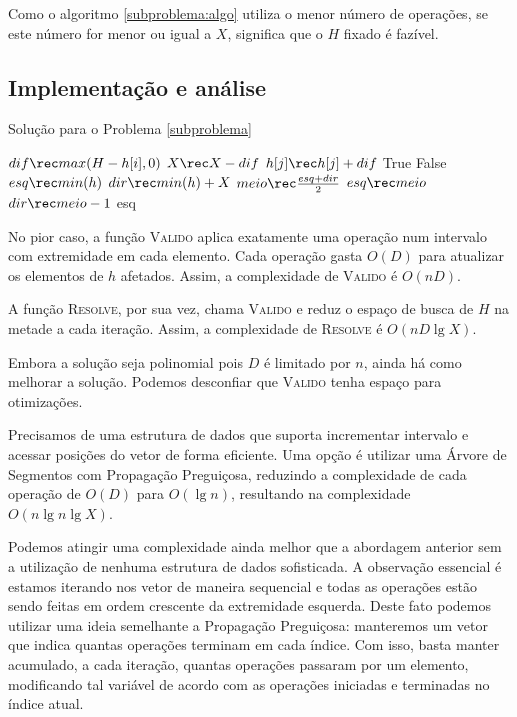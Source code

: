 Como o algoritmo \ref{subproblema:algo} utiliza o menor número de operações, se este número for menor ou igual a $X$, significa que o $H$ fixado é fazível.

\subsection*{Implementação e análise}

\begin{algorithm}[H]
\caption{Solução para o Problema \ref{subproblema}}
\label{subproblema:code}
\begin{algorithmic}[1]
        \State $dif \rec max(H - h[i], 0)$
        \State $X \rec X - dif$
            \State $h[j] \rec h[j] + dif$
        \EndFor
    \EndFor
        \Return True
    \Else
        \Return False
    \EndIf
\EndFunction
{}
    \State $esq \rec min(h)$
    \State $dir \rec min(h) + X$
        \State $meio \rec \frac{esq + dir}{2}$
            \State $esq \rec meio$
        \Else
            \State $dir \rec meio - 1$
        \EndIf
    \EndWhile
    \State \Return esq
\EndFunction
\end{algorithmic}
\end{algorithm}

No pior caso, a função \textsc{Valido} aplica exatamente uma operação num intervalo com extremidade em cada elemento. Cada operação gasta $O(D)$ para atualizar os elementos de $h$ afetados. Assim, a complexidade de \textsc{Valido} é $O(nD)$.

A função \textsc{Resolve}, por sua vez, chama \textsc{Valido} e reduz o espaço de busca de $H$ na metade a cada iteração. Assim, a complexidade de \textsc{Resolve} é $O(nD \lg X)$.

Embora a solução seja polinomial pois $D$ é limitado por $n$, ainda há como melhorar a solução. Podemos desconfiar que \textsc{Valido} tenha espaço para otimizações. 

Precisamos de uma estrutura de dados que suporta incrementar intervalo e acessar posições do vetor de forma eficiente. Uma opção é utilizar uma Árvore de Segmentos com Propagação Preguiçosa, reduzindo a complexidade de cada operação de $O(D)$ para $O(\lg n)$, resultando na complexidade $O(n \lg n \lg X)$.

Podemos atingir uma complexidade ainda melhor que a abordagem anterior sem a utilização de nenhuma estrutura de dados sofisticada. A observação essencial é estamos iterando nos vetor de maneira sequencial e todas as operações estão sendo feitas em ordem crescente da extremidade esquerda. Deste fato podemos utilizar uma ideia semelhante a Propagação Preguiçosa: manteremos um vetor que indica quantas operações terminam em cada índice. Com isso, basta manter acumulado, a cada iteração, quantas operações passaram por um elemento, modificando tal variável de acordo com as operações iniciadas e terminadas no índice atual.

